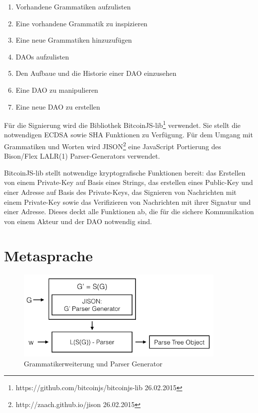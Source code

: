 \documentclass[a4paper,12pt]{report}
\begin{document}
\begin{enumerate}
  \item Vorhandene Grammatiken aufzulisten
  \item Eine vorhandene Grammatik zu inspizieren
  \item Eine neue Grammatiken hinzuzufügen
  \item DAOs aufzulisten
  \item Den Aufbaue und die Historie einer DAO einzusehen
  \item Eine DAO zu manipulieren
  \item Eine neue DAO zu erstellen
\end{enumerate}

Für die Signierung wird die Bibliothek BitcoinJS-lib\footnote{https://github.com/bitcoinjs/bitcoinjs-lib 26.02.2015} verwendet. Sie stellt die notwendigen ECDSA sowie SHA Funktionen zu Verfügung. Für dem Umgang mit Grammatiken und Worten wird JISON\footnote{http://zaach.github.io/jison 26.02.2015} eine JavaScript Portierung des Bison/Flex LALR(1) Parser-Generators verwendet.

BitcoinJS-lib stellt notwendige kryptografische Funktionen bereit: das Erstellen von einem Private-Key auf Basis eines Strings, das erstellen eines Public-Key und einer Adresse auf Basis des Private-Keys, das Signieren von Nachrichten mit einem Private-Key sowie das Verifizieren von Nachrichten mit ihrer Signatur und einer Adresse. Dieses deckt alle Funktionen ab, die für die sichere Kommunikation von einem Akteur und der DAO notwendig sind.

\section{Metasprache}
\label{metalang}
\begin{figure}[ht]
    \centering
    \includegraphics[width=0.90\textwidth]{bilder/parsergenerator.png}
    \caption{Grammatikerweiterung und Parser Generator}
\end{figure}
\end{document}
